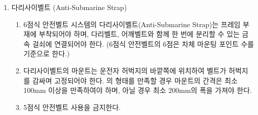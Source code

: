 \documentclass[final,a4paper,10pt]{report}
\begin{document}
\begin{enumerate}
\begin{enumerate}
      \end{enumerate}
    \item\label{rule:formula-technical.safety-belt.anti-submarine-strap} 다리사이벨트 (Anti-Submarine Strap)
      \begin{enumerate}
        \item\label{rule:formula-technical.safety-belt.anti-submarine-strap.frame-mount-shared-release} 6점식 안전벨트 시스템의 다리사이벨트(Anti-Submarine Strap)는 프레임 부재에 부착되어야 하며, 다리벨트, 어깨벨트와 함께 한 번에 분리할 수 있는 금속 걸쇠에 연결되어야 한다. (6점식 안전벨트의 6점은 차체 마운팅 포인트 수를 기준으로 한다.)
        \item\label{rule:formula-technical.safety-belt.anti-submarine-strap.mount-spacing-outside-thigh} 다리사이벨트의 마운트는 운전자 허벅지의 바깥쪽에 위치하여 벨트가 허벅지를 감싸며 고정되어야 한다. 의 형태를 만족할 경우 마운트의 간격은 최소 100mm 이상을 만족하여야 하며, 아닐 경우 최소 200mm의 폭을 가져야 한다.
        \item\label{rule:formula-technical.safety-belt.anti-submarine-strap.no-five-point-harness} 5점식 안전벨트 사용을 금지한다.

      \end{enumerate}
  \end{enumerate}
\end{document}
